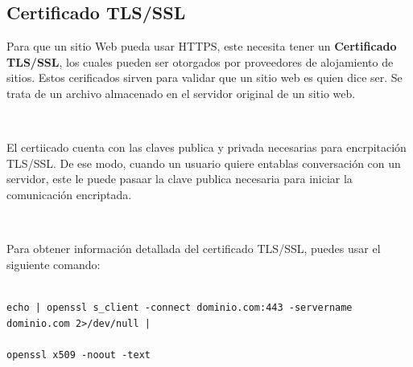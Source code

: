 \documentclass[a4paper,10pt]{article}
\begin{document}
\subsection{Certificado TLS/SSL}

Para que un sitio Web pueda usar HTTPS, este necesita tener un \textbf{Certificado TLS/SSL}, los cuales pueden ser otorgados por proveedores de alojamiento de sitios.
Estos cerificados sirven para validar que un sitio web es quien dice ser. Se trata de un archivo almacenado en el servidor original de un sitio web.

\

El certiicado cuenta con las claves publica y privada necesarias para encrpitación TLS/SSL. De ese modo, cuando un usuario quiere entablas conversación con un servidor, este le puede pasaar la clave publica 
necesaria para iniciar la comunicación encriptada.

\

Para obtener información detallada del certificado TLS/SSL, puedes usar el siguiente comando:

\begin{lstlisting}

echo | openssl s_client -connect dominio.com:443 -servername dominio.com 2>/dev/null | 

openssl x509 -noout -text   

\end{lstlisting}
\end{document}
